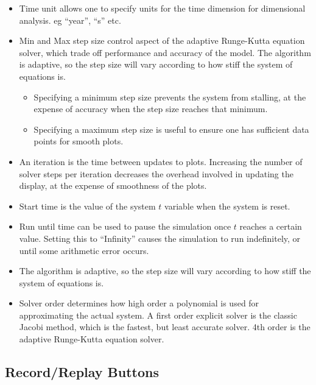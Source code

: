 \begin{itemize}
\item Time unit allows one to specify units for the time dimension for dimensional
analysis. eg ``year'', ``s'' etc. 
\item Min and Max step size control aspect of the adaptive Runge-Kutta equation
solver, which trade off performance and accuracy of the model. The
algorithm is adaptive, so the step size will vary according to how
stiff the system of equations is. 
\begin{itemize}
\item Specifying a minimum step size prevents the system from stalling,
at the expense of accuracy when the step size reaches that minimum. 
\item Specifying a maximum step size is useful to ensure one has sufficient
data points for smooth plots. 
\end{itemize}
\item An iteration is the time between updates to plots. Increasing the
number of solver steps per iteration decreases the overhead involved
in updating the display, at the expense of smoothness of the plots.
\item Start time is the value of the system $t$ variable when the system
is reset. 
\item Run until time can be used to pause the simulation once $t$ reaches
a certain value. Setting this to ``Infinity'' causes the simulation
to run indefinitely, or until some arithmetic error occurs. 
\item The algorithm is adaptive, so the step size will vary according to
how stiff the system of equations is. 
\item Solver order determines how high order a polynomial is used for approximating
the actual system. A first order explicit solver is the classic Jacobi
method, which is the fastest, but least accurate solver. 4th order
is the adaptive Runge-Kutta equation solver.
\end{itemize}

\subsection{Record/Replay Buttons}

\label{RecReplayButtons}



